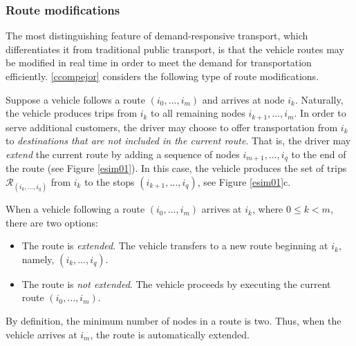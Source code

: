 \documentclass[dissertation,draft*]{aaltoseries}
\begin{document}
\subsubsection{Route modifications}
\label{routemodifications}
The most distinguishing feature of demand-responsive transport, which differentiates it from 
traditional public transport, is that the vehicle routes may be modified in
real time in order to meet the demand for transportation efficiently.
\ref{ccompejor} considers the following type of route modifications.

Suppose a vehicle follows a route $(i_0,\ldots,i_m)$ and arrives at node $i_k$.
Naturally, the vehicle produces trips from $i_k$ to all remaining nodes $i_{k+1},\ldots,i_m$.
In order to serve additional customers, the driver may choose to offer transportation from
$i_k$ to \emph{destinations that are not included in the current route}. That is, the driver may 
\emph{extend} the current route by adding a sequence of nodes $i_{m+1},\ldots,i_q$ to 
the end of the route (see Figure \ref{esim01}). In this case, the vehicle produces the set of trips 
$\mathcal{R}_{(i_k,\ldots, i_q)}$
from $i_k$ to the stops $(i_{k+1},\ldots,i_q)$, see Figure \ref{esim01}c.

When a vehicle following a route $(i_0,\ldots,i_m)$ arrives at $i_k$, where $0 \leq k < m$, there
are two options:
\begin{itemize}
\item
The route is \emph{extended}. The vehicle transfers to a new route beginning at $i_k$, namely, $(i_{k},\ldots,i_q)$.
\item
The route is \emph{not extended}. The vehicle proceeds by executing the current route $(i_0,\ldots,i_m)$.
\end{itemize}
By definition, the minimum number of nodes in a route is two. Thus, when the vehicle arrives at $i_m$,
the route is automatically extended.
\end{document}
